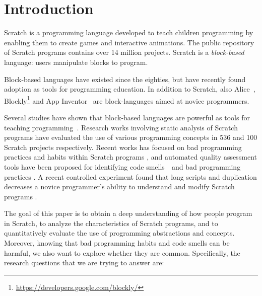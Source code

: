 \documentclass{sig-alternate}
\begin{document}



\section{Introduction}

Scratch \cite{resnick_scratch:_2009} is a programming language developed to teach children programming by enabling them to create games and interactive animations. The public repository of Scratch programs contains over 14 million projects. Scratch is a \emph{block-based} language: users manipulate blocks to program.

Block-based languages have existed since the eighties, but have recently found adoption as tools for programming education. In addition to Scratch, also Alice~\cite{conway_alice:_1994}, Blockly\footnote{\url{https://developers.google.com/blockly/}} and App Inventor~\cite{wolber_app_2011} are block-languages aimed at novice programmers.

Several studies have shown that block-based languages are powerful as tools for teaching programming~\cite{meerbaum-salant_learning_2010, b._moskal_evaluating_2005,cooper_teaching_2003,price_comparing_2015}. Research works involving static analysis of Scratch programs \cite{Maloney_2008,moreno_automatic_2014} have evaluated the use of various programming concepts in 536 and 100 Scratch projects respectively. Recent works has focused on bad programming practices and habits within Scratch programs \cite{Meerbaum_habits_2011}, and automated quality assessment tools have been proposed for identifying code smells~\cite{fowler_refactoring:_1999}~and bad programming practices \cite{boe_hairball:_2013,moreno_automatic_2014}. A recent controlled experiment found that long scripts and duplication decreases a novice programmer's ability to understand and modify Scratch programs \cite{hermans_2016}.

The goal of this paper is to obtain a deep understanding of how people program in Scratch, to analyze the characteristics of Scratch programs, and to quantitatively evaluate the use of programming abstractions and concepts. Moreover, knowing that bad programming habits and code smells can be harmful, we also want to explore whether they are common. Specifically, the research questions that we are trying to answer are:
\end{document}
